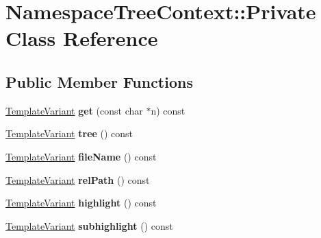 \hypertarget{class_namespace_tree_context_1_1_private}{}\section{Namespace\+Tree\+Context\+::Private Class Reference}
\label{class_namespace_tree_context_1_1_private}
\subsection*{Public Member Functions}
\begin{DoxyCompactItemize}
\item 
\mbox{\label{class_namespace_tree_context_1_1_private_a9533c75bef062dac41d0a4e124361cc7}} 
\mbox{\hyperlink{class_template_variant}{Template\+Variant}} {\bfseries get} (const char $\ast$n) const
\item 
\mbox{\label{class_namespace_tree_context_1_1_private_ad4220e1c6eb70f9ee8ce9ef3516e501b}} 
\mbox{\hyperlink{class_template_variant}{Template\+Variant}} {\bfseries tree} () const
\item 
\mbox{\label{class_namespace_tree_context_1_1_private_a590a6448571308d13a4b10ade63b5243}} 
\mbox{\hyperlink{class_template_variant}{Template\+Variant}} {\bfseries file\+Name} () const
\item 
\mbox{\label{class_namespace_tree_context_1_1_private_a5a88d11477e7b3480c7153141dea2141}} 
\mbox{\hyperlink{class_template_variant}{Template\+Variant}} {\bfseries rel\+Path} () const
\item 
\mbox{\label{class_namespace_tree_context_1_1_private_a5bf87c93a22db58e243170014dffdaf3}} 
\mbox{\hyperlink{class_template_variant}{Template\+Variant}} {\bfseries highlight} () const
\item 
\mbox{\label{class_namespace_tree_context_1_1_private_a1adb7fc58d5e17d99b417956895707ba}} 
\mbox{\hyperlink{class_template_variant}{Template\+Variant}} {\bfseries subhighlight} () const
\item 

\end{DoxyCompactItemize}

